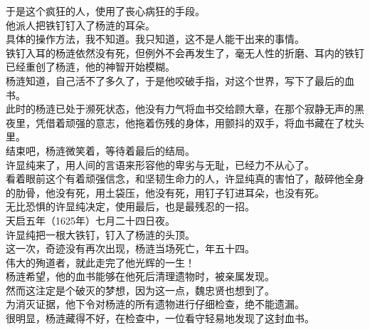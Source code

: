\begin{multicols}{\theparacolNo}
于是这个疯狂的人，使用了丧心病狂的手段。\\

他派人把铁钉钉入了杨涟的耳朵。\\

具体的操作方法，我不知道。我只知道，这不是人能干出来的事情。\\

铁钉入耳的杨涟依然没有死，但例外不会再发生了，毫无人性的折磨、耳内的铁钉已经重创了杨涟，他的神智开始模糊。\\

杨涟知道，自己活不了多久了，于是他咬破手指，对这个世界，写下了最后的血书。\\

此时的杨涟已处于濒死状态，他没有力气将血书交给顾大章，在那个寂静无声的黑夜里，凭借着顽强的意志，他拖着伤残的身体，用颤抖的双手，将血书藏在了枕头里。\\

结束吧，杨涟微笑着，等待着最后的结局。\\

许显纯来了，用人间的言语来形容他的卑劣与无耻，已经力不从心了。\\

看着眼前这个有着顽强信念，和坚韧生命力的人，许显纯真的害怕了，敲碎他全身的肋骨，他没有死，用土袋压，他没有死，用钉子钉进耳朵，也没有死。\\

无比恐惧的许显纯决定，使用最后，也是最残忍的一招。\\

天启五年（1625年）七月二十四日夜。\\

许显纯把一根大铁钉，钉入了杨涟的头顶。\\

这一次，奇迹没有再次出现，杨涟当场死亡，年五十四。\\

伟大的殉道者，就此走完了他光辉的一生！\\

杨涟希望，他的血书能够在他死后清理遗物时，被亲属发现。\\

然而这注定是个破灭的梦想，因为这一点，魏忠贤也想到了。\\

为消灭证据，他下令对杨涟的所有遗物进行仔细检查，绝不能遗漏。\\

很明显，杨涟藏得不好，在检查中，一位看守轻易地发现了这封血书。\\


\end{multicols}
